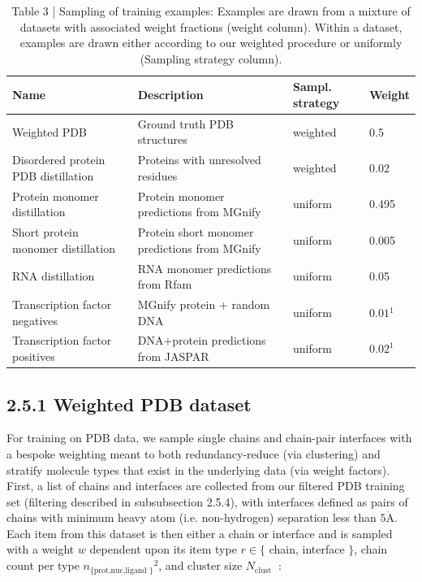 \documentclass[10pt]{article}
\def\AA{\mathring{\mathrm{A}}}
\begin{document}
\begin{table}[h]
\begin{center}
\captionsetup{labelformat=empty}
\caption{Table 3 | Sampling of training examples: Examples are drawn from a mixture of datasets with associated weight fractions (weight column). Within a dataset, examples are drawn either according to our weighted procedure or uniformly (Sampling strategy column).}
\begin{tabular}{|l|l|l|l|}
\hline
Name & Description & Sampl. strategy & Weight \\
\hline
Weighted PDB & Ground truth PDB structures & weighted & 0.5 \\
\hline
Disordered protein PDB distillation & Proteins with unresolved residues & weighted & 0.02 \\
\hline
Protein monomer distillation & Protein monomer predictions from MGnify & uniform & 0.495 \\
\hline
Short protein monomer distillation & Protein short monomer predictions from MGnify & uniform & 0.005 \\
\hline
RNA distillation & RNA monomer predictions from Rfam & uniform & 0.05 \\
\hline
Transcription factor negatives & MGnify protein + random DNA & uniform & $0.01{ }^{1}$ \\
\hline
Transcription factor positives & DNA+protein predictions from JASPAR & uniform & $0.02^{1}$ \\
\hline
\end{tabular}
\end{center}
\end{table}

\subsection*{2.5.1 Weighted PDB dataset}
For training on PDB data, we sample single chains and chain-pair interfaces with a bespoke weighting meant to both redundancy-reduce (via clustering) and stratify molecule types that exist in the underlying data (via weight factors). First, a list of chains and interfaces are collected from our filtered PDB training set (filtering described in subsubsection 2.5.4), with interfaces defined as pairs of chains with minimum heavy atom (i.e. non-hydrogen) separation less than $5 \AA$. Each item from this dataset is then either a chain or interface and is sampled with a weight $w$ dependent upon its item type $r \in\{$ chain, interface $\}$, chain count per type $n_{\{\text {prot,nuc,ligand }\}}{ }^{2}$, and cluster size $N_{\text {clust }}$ :
\end{document}
